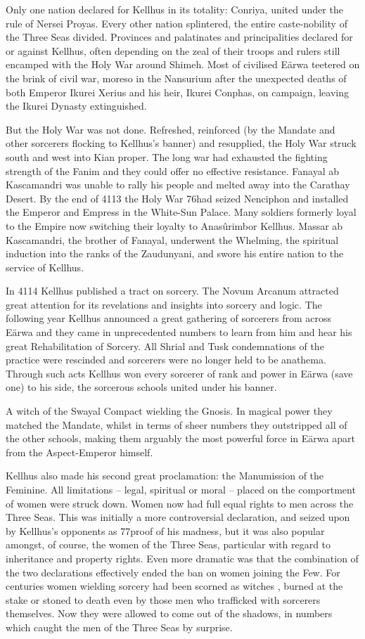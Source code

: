 \documentclass[]{book}
\begin{document}
Only one nation declared for Kellhus in its totality: Conriya, united under the rule of
Nersei Proyas. Every other nation splintered, the entire caste-nobility of the Three Seas
divided. Provinces and palatinates and principalities declared for or against Kellhus,
often depending on the zeal of their troops and rulers still encamped with the Holy
War around Shimeh. Most of civilised Eärwa teetered on the brink of civil war, moreso
in the Nansurium after the unexpected deaths of both Emperor Ikurei Xerius and his
heir, Ikurei Conphas, on campaign, leaving the Ikurei Dynasty extinguished.

But the Holy War was not done. Refreshed, reinforced (by the Mandate and other
sorcerers flocking to Kellhus's banner) and resupplied, the Holy War struck south and
west into Kian proper. The long war had exhausted the fighting strength of the Fanim
and they could offer no effective resistance. Fanayal ab Kascamandri was unable to rally
his people and melted away into the Carathay Desert. By the end of 4113 the Holy War
76had seized Nenciphon and installed the Emperor and Empress in the White-Sun
Palace. Many soldiers formerly loyal to the Empire now switching their loyalty to
Anasûrimbor Kellhus. Massar ab Kascamandri, the brother of Fanayal, underwent the
Whelming, the spiritual induction into the ranks of the Zaudunyani, and swore his
entire nation to the service of Kellhus.

In 4114 Kellhus published a tract on sorcery. The Novum Arcanum attracted great
attention for its revelations and insights into sorcery and logic. The following year
Kellhus announced a great gathering of sorcerers from across Eärwa and they came in
unprecedented numbers to learn from him and hear his great Rehabilitation of Sorcery.
All Shrial and Tusk condemnations of the practice were rescinded and sorcerers were
no longer held to be anathema. Through such acts Kellhus won every sorcerer of rank
and power in Eärwa (save one) to his side, the sorcerous schools united under his
banner.

A witch of the Swayal Compact wielding the Gnosis. In magical power they matched the Mandate, whilst in terms of sheer numbers they outstripped all of the other schools, making them arguably the most powerful force in Eärwa apart from the Aspect-Emperor himself.

Kellhus also made his second great proclamation: the Manumission of the Feminine.
All limitations -- legal, spiritual or moral -- placed on the comportment of women were
struck down. Women now had full equal rights to men across the Three Seas. This was
initially a more controversial declaration, and seized upon by Kellhus's opponents as
77proof of his madness, but it was also popular amongst, of course, the women of the
Three Seas, particular with regard to inheritance and property rights. Even more
dramatic was that the combination of the two declarations effectively ended the ban on
women joining the Few. For centuries women wielding sorcery had been scorned as
witches , burned at the stake or stoned to death even by those men who trafficked with
sorcerers themselves. Now they were allowed to come out of the shadows, in numbers
which caught the men of the Three Seas by surprise.
\end{document}

